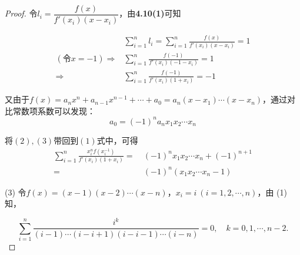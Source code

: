 \documentclass[12pt, a4paper, oneside]{ctexart}
\begin{document}
\begin{proof}
    令$l_i = \dfrac{f(x)}{f'(x_i)(x-x_i)}$，由\textbf{4.10(1)}可知

    \begin{equation}
        \begin{aligned}
            &\sum_{i=1}^nl_i = \sum_{i=1}^n\frac{f(x)}{f'(x_i)(x-x_i)} = 1\\
            (\text{令}x=-1) \Rightarrow& \sum_{i=1}^n\frac{f(-1)}{f'(x_i)(-1-x_i)} = 1\\
            \Rightarrow& \sum_{i=1}^n\frac{f(-1)}{f'(x_i)(1+x_i)} = -1
        \end{aligned}
    \end{equation}

    又由于$f(x) = a_nx^n+a_{n-1}x^{n-1}+\cdots+a_0=a_n(x-x_1)\cdots(x-x_n)$，通过对比常数项系数可以发现：
    \begin{equation}
        a_0=(-1)^na_nx_1x_2\cdots x_n
    \end{equation}

    将$(2),(3)$带回到$(1)$式中，可得
    \begin{equation*}
        \begin{aligned}
            \sum_{i=1}^n\frac{x_i^nf(x_i^{-1})}{f'(x_i)(1+x_i)} =&\ (-1)^nx_1x_2\cdots x_n+(-1)^{n+1}\\
            =&\ (-1)^n(x_1x_2\cdots x_n-1)
        \end{aligned}
    \end{equation*}

    (3) 令$f(x) = (x-1)(x-2)\cdots(x-n)$，$x_i=i\ (i=1,2,\cdots, n)$，由 (1) 知，

    \begin{equation*}
        \sum_{i=1}^n\frac{i^k}{(i-1)\cdots(i-i+1)(i-i-1)\cdots(i-n)}=0,\quad k=0,1,\cdots,n-2.
    \end{equation*}
\end{proof}
\end{document}
